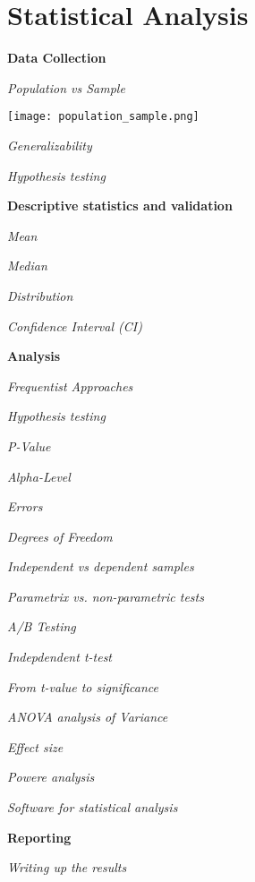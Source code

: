 \section{Statistical Analysis}

\textbf{Data Collection}

\textit{Population vs Sample}


\begin{center}
	\texttt{[image: population\_sample.png]}
\end{center}


\textit{Generalizability}


\textit{Hypothesis testing}


\textbf{Descriptive statistics and validation}

\textit{Mean}

\textit{Median}


\textit{Distribution}

\textit{Confidence Interval (CI)}


\textbf{Analysis}

\textit{Frequentist Approaches}


\textit{Hypothesis testing}

\textit{P-Value}

\textit{Alpha-Level}

\textit{Errors}

\textit{Degrees of Freedom}


\textit{Independent vs dependent samples}


\textit{Parametrix vs. non-parametric tests}


\textit{A/B Testing}


\textit{Indepdendent t-test}


\textit{From t-value to significance}


\textit{ANOVA analysis of Variance}


\textit{Effect size}

\textit{Powere analysis}


\textit{Software for statistical analysis}


\textbf{Reporting}


\textit{Writing up the results}













